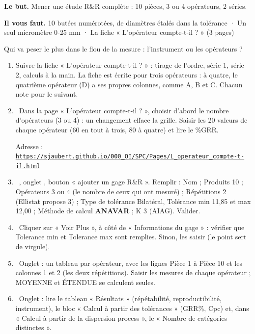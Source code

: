 \documentclass[10pt,a4paper]{article}
\begin{document}
\thispagestyle{fancy}
\begin{tcolorbox}[boite]\textbf{Le but.} Mener une étude R\&R complète : 10 pièces, 3 ou 4 opérateurs, 2 séries.\par\textbf{Il vous faut.} 10 butées numérotées, de diamètres étalés dans la tolérance · Un seul micromètre 0-25 mm · La fiche « L'opérateur compte-t-il ? » (3 pages)\end{tcolorbox}
\begin{tcolorbox}[pred]Qui va peser le plus dans le flou de la mesure : l'instrument ou les opérateurs ?\reponse\end{tcolorbox}
\begin{enumerate}[label=\textcolor{cyan}{\textbf{\arabic*.}},leftmargin=15pt,itemsep=1.5pt]
\item Suivre la fiche « L'opérateur compte-t-il ? » : tirage de l'ordre, série 1, série 2, calculs à la main. La fiche est écrite pour trois opérateurs : à quatre, le quatrième opérateur (D) a ses propres colonnes, comme A, B et C. Chacun note pour le suivant.
\item \tagW\ Dans la page « L'opérateur compte-t-il ? », choisir d'abord le nombre d'opérateurs (3 ou 4) : un changement efface la grille. Saisir les 20 valeurs de chaque opérateur (60 en tout à trois, 80 à quatre) et lire le \%GRR.\par Adresse : \href{https://sjaubert.github.io/000_OI/SPC/Pages/L_operateur_compte-t-il.html}{\nolinkurl{https://sjaubert.github.io/000_OI/SPC/Pages/L_operateur_compte-t-il.html}}
\item \tagE\ , onglet , bouton « ajouter un gage R\&R ». Remplir : Nom ; Produits 10 ; Opérateurs 3 ou 4 (le nombre de ceux qui ont mesuré) ; Répétitions 2 (Ellistat propose 3) ; Type de tolérance Bilatéral, Tolérance min 11,85 et max 12,00 ; Méthode de calcul \textbf{ANAVAR} ; K 3 (AIAG). Valider.
\item \tagE\ Cliquer sur « Voir Plus », à côté de « Informations du gage » : vérifier que Tolerance min et Tolerance max sont remplies. Sinon, les saisir (le point sert de virgule).
\item \tagE\ Onglet  : un tableau par opérateur, avec les lignes Pièce 1 à Pièce 10 et les colonnes 1 et 2 (les deux répétitions). Saisir les mesures de chaque opérateur ; MOYENNE et ÉTENDUE se calculent seules.
\item \tagE\ Onglet  : lire le tableau « Résultats » (répétabilité, reproductibilité, instrument), le bloc « Calcul à partir des tolérances » (GRR\%, Cpc) et, dans « Calcul à partir de la dispersion process », le « Nombre de catégories distinctes ».
\end{enumerate}
\end{document}
